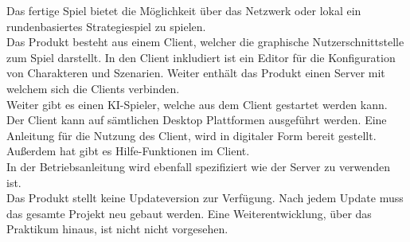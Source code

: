 Das fertige Spiel bietet die Möglichkeit über das Netzwerk oder lokal ein rundenbasiertes
Strategiespiel zu spielen.\\
Das Produkt besteht aus einem Client, welcher die graphische Nutzerschnittstelle zum Spiel
darstellt. In den Client inkludiert ist ein Editor für die Konfiguration von Charakteren und
Szenarien. Weiter enthält das Produkt einen Server mit welchem sich die Clients verbinden.\\
Weiter gibt es einen KI-Spieler, welche aus dem Client gestartet werden kann.\\
Der Client kann auf sämtlichen Desktop Plattformen ausgeführt werden. Eine Anleitung für die Nutzung des Client, wird in digitaler Form bereit gestellt. 
Außerdem hat gibt es Hilfe-Funktionen im Client.\\
In der Betriebsanleitung wird ebenfall spezifiziert wie der Server zu verwenden ist.\\

Das Produkt stellt keine Updateversion zur Verfügung. Nach jedem Update muss das gesamte Projekt
neu gebaut werden. Eine Weiterentwicklung, über das Praktikum hinaus, ist nicht nicht vorgesehen.
